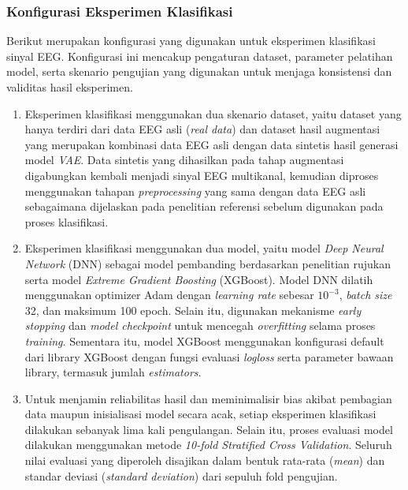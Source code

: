 \subsubsection{Konfigurasi Eksperimen Klasifikasi}
Berikut merupakan konfigurasi yang digunakan untuk eksperimen klasifikasi sinyal EEG. Konfigurasi ini mencakup pengaturan dataset, parameter pelatihan model, serta skenario pengujian yang digunakan untuk menjaga konsistensi dan validitas hasil eksperimen.
\begin{enumerate}
    \item {}
    Eksperimen klasifikasi menggunakan dua skenario dataset, yaitu dataset yang hanya terdiri dari data EEG asli (\textit{real data}) dan dataset hasil augmentasi yang merupakan kombinasi data EEG asli dengan data sintetis hasil generasi model \textit{VAE}. Data sintetis yang dihasilkan pada tahap augmentasi digabungkan kembali menjadi sinyal EEG multikanal, kemudian diproses menggunakan tahapan \textit{preprocessing} yang sama dengan data EEG asli sebagaimana dijelaskan pada penelitian referensi \cite{paper_ref} sebelum digunakan pada proses klasifikasi.

    \item {}
    Eksperimen klasifikasi menggunakan dua model, yaitu model \textit{Deep Neural Network} (DNN) sebagai model pembanding berdasarkan penelitian rujukan serta model \textit{Extreme Gradient Boosting} (XGBoost). Model DNN dilatih menggunakan optimizer Adam dengan \textit{learning rate} sebesar $10^{-3}$, \textit{batch size} 32, dan maksimum 100 epoch. Selain itu, digunakan mekanisme \textit{early stopping} dan \textit{model checkpoint} untuk mencegah \textit{overfitting} selama proses \textit{training}. Sementara itu, model XGBoost menggunakan konfigurasi default dari library XGBoost dengan fungsi evaluasi \textit{logloss} serta parameter bawaan library, termasuk jumlah \textit{estimators}.

   \item {} 
    Untuk menjamin reliabilitas hasil dan meminimalisir bias akibat pembagian data maupun inisialisasi model secara acak, setiap eksperimen klasifikasi dilakukan sebanyak lima kali pengulangan. Selain itu, proses evaluasi model dilakukan menggunakan metode \textit{10-fold Stratified Cross Validation}. Seluruh nilai evaluasi yang diperoleh disajikan dalam bentuk rata-rata (\textit{mean}) dan standar deviasi (\textit{standard deviation}) dari sepuluh fold pengujian. 
\end{enumerate}

